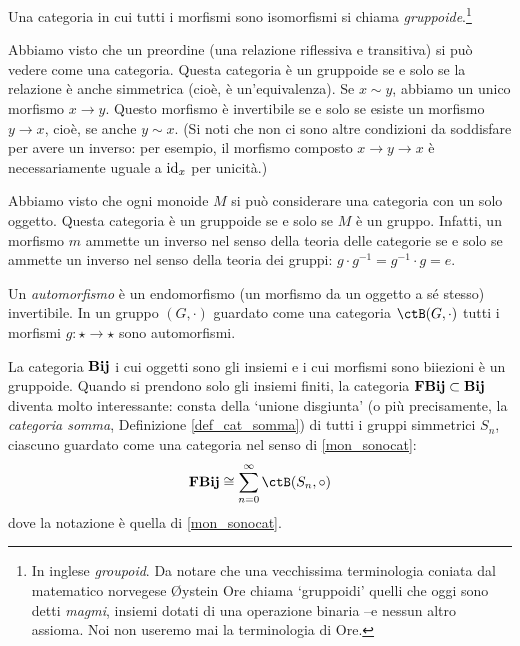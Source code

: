 \begin{definition}[Gruppoide]\label{def_gruppoide}
	Una categoria in cui tutti i morfismi sono isomorfismi si chiama \emph{gruppoide}.\footnote{In inglese \emph{groupoid}. Da notare che una vecchissima terminologia coniata dal matematico norvegese Øystein Ore chiama `gruppoidi' quelli che oggi sono detti \emph{magmi}, insiemi dotati di una operazione binaria --e nessun altro assioma. Noi non useremo mai la terminologia di Ore.}
\end{definition}
\begin{example}\label{exa_releq_groupoid}
	Abbiamo visto che un preordine (una relazione riflessiva e transitiva) si può vedere come una categoria. Questa categoria è un gruppoide se e solo se la relazione è anche simmetrica (cioè, è un'equivalenza). Se \(x\sim y\), abbiamo un unico morfismo \(x\to y\). Questo morfismo è invertibile se e solo se esiste un morfismo \(y\to x\), cioè, se anche \(y\sim x\). (Si noti che non ci sono altre condizioni da soddisfare per avere un inverso: per esempio, il morfismo composto \(x\to y\to x\) è necessariamente uguale a \(\mathrm{id}_x\) per unicità.)
\end{example}
\begin{example}\label{exa_grp_groupoid}
	Abbiamo visto che ogni monoide \(M\) si può considerare una categoria con un solo oggetto. Questa categoria è un gruppoide se e solo se \(M\) è un gruppo. Infatti, un morfismo \(m\) ammette un inverso nel senso della teoria delle categorie se e solo se ammette un inverso nel senso della teoria dei gruppi: \(g\cdot g^{-1}=g^{-1}\cdot g = e\).
\end{example}

Un \emph{automorfismo} è un endomorfismo (un morfismo da un oggetto a sé stesso) invertibile. In un gruppo \((G,\cdot)\) guardato come una categoria \(\ctB(G,\cdot)\) tutti i morfismi \(g : \star\to\star\) sono automorfismi.

\begin{example}
	La categoria \(\mathbf{Bij}\) i cui oggetti sono gli insiemi e i cui morfismi sono biiezioni è un gruppoide. Quando si prendono solo gli insiemi finiti, la categoria \(\mathbf{FBij}\subset\mathbf{Bij}\) diventa molto interessante: consta della `unione disgiunta' (o più precisamente, la \emph{categoria somma}, Definizione \ref{def_cat_somma}) di tutti i gruppi simmetrici \(S_n\), ciascuno guardato come una categoria nel senso di \ref{mon_sonocat}:
	\[\cate{FBij}\cong \sum_{n=0}^\infty \ctB(S_n,\circ)\]
	dove la notazione è quella di \ref{mon_sonocat}.
\end{example}

